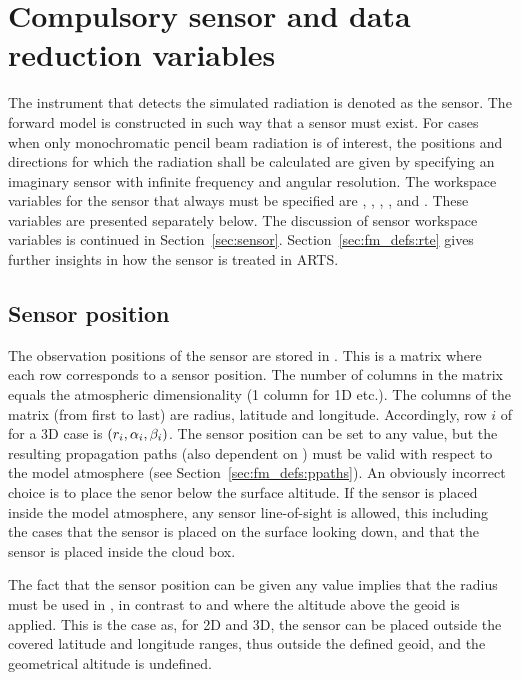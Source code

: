 \section{Compulsory sensor and data reduction variables}
\label{sec:fm_defs:sensor1}

The instrument that detects the simulated radiation is denoted as the
sensor. The forward model is constructed in such
way that a sensor must exist. For cases when only monochromatic pencil
beam radiation is of interest, the positions and directions for which
the radiation shall be calculated are given by specifying an imaginary
sensor with infinite frequency and angular resolution. The workspace
variables for the sensor that always must be specified are
, ,
, ,
 and . These
variables are presented separately below. The discussion of sensor
workspace variables is continued in Section~\ref{sec:sensor}.
Section~\ref{sec:fm_defs:rte} gives further insights in how the sensor
is treated in ARTS.


\subsection{Sensor position}
\label{sec:fm_defs:sensorpos}

The observation positions of the sensor are stored in
. This is a matrix where each row corresponds to
a sensor position. The number of columns in the matrix equals the
atmospheric dimensionality (1 column for 1D etc.). The columns of the
matrix (from first to last) are radius, latitude and longitude.
Accordingly, row $i$ of  for a 3D case is
$(r_{i},\alpha_{i},\beta_{i})$. The sensor position can be set to any
value, but the resulting propagation paths (also dependent on
) must be valid with respect to the model
atmosphere (see Section~\ref{sec:fm_defs:ppaths}). An obviously
incorrect choice is to place the senor below the surface altitude. If
the sensor is placed inside the model atmosphere, any sensor
line-of-sight is allowed, this including the cases that the sensor is
placed on the surface looking down, and that the sensor is placed
inside the cloud box.

The fact that the sensor position can be given any value implies that
the radius must be used in , in contrast to
 and  where the altitude
above the geoid is applied. This is the case as, for 2D and 3D, the
sensor can be placed outside the covered latitude and longitude
ranges, thus outside the defined geoid, and the geometrical altitude is
undefined. 

